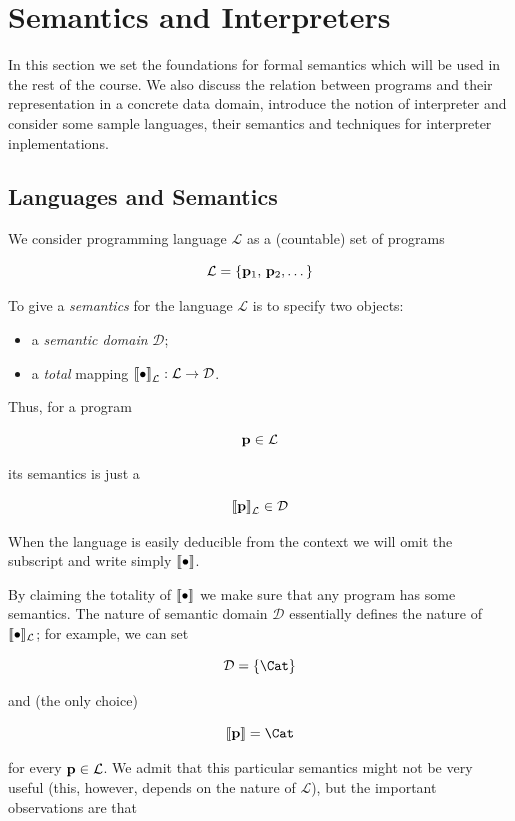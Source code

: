 \chapter{Semantics and Interpreters}

In this section we set the foundations for formal semantics which will be used in the rest of the course. We also discuss the
relation between programs and their representation in a concrete data domain, introduce the notion of interpreter and
consider some sample languages, their semantics and techniques for interpreter inplementations.

\section{Languages and Semantics}

We consider programming language $\mathcal L$ as a (countable) set of programs

\[
\mathcal{L}=\{\mathbf{p}_1,\,\mathbf{p}_2,\dots\}
\]

To give a \emph{semantics} for the language $\mathcal L$ is to specify two objects:

\begin{itemize}
\item a \emph{semantic domain} $\mathcal D$;
\item a \emph{total} mapping $\sembr{\bullet}^\ph_{\mathcal L} : \mathcal L \to \mathcal D$.
\end{itemize}

Thus, for a program

\[
\mathbf{p}\in\mathcal L
\]

its semantics is just a

\[
\sembr{\primi{p}}^\ph_{\mathcal L}\in\mathcal D
\]

When the language is easily deducible from the context we will omit the subscript and write simply $\llbracket{\bullet}\rrbracket$.

By claiming the totality of $\llbracket{\bullet}\rrbracket$ we 
make sure that any program has some semantics. The nature of semantic domain $\mathcal D$ essentially defines the nature of $\llbracket{\bullet}\rrbracket_{\mathcal L}$;
for example, we can set

\[
\mathcal D=\{\Cat\}
\]

and (the only choice)

\[
\sembr{\primi{p}}=\Cat
\]

for every $\mathbf{p}\in\mathcal L$. We admit that this particular
semantics might not be very useful (this, however, depends on the nature of $\mathcal L$), but the important observations are that

